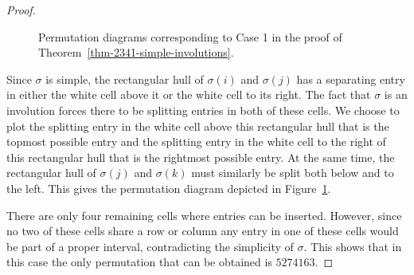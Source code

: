 \documentclass[10pt]{article}
\theoremstyle{plain}
\begin{document}
\begin{proof}
\begin{figure}
\begin{footnotesize}
\begin{subfigure}[b]{0.3\textwidth}
\begin{center}


			\end{center}	
			\caption{}
			\label{figure:6_1-3}
		\end{subfigure}
		\hfill\hfill
		\caption{Permutation diagrams corresponding to Case 1 in the proof of Theorem~\ref{thm-2341-simple-involutions}.}
		\label{figure:6_1-group-1}
	\end{footnotesize}
	\end{figure}
	
	Since $\sigma$ is simple, the rectangular hull of $\sigma(i)$ and $\sigma(j)$ has a separating entry in either the white cell above it or the white cell to its right. The fact that $\sigma$ is an involution forces there to be splitting entries in both of these cells. We choose to plot the splitting entry in the white cell above this rectangular hull that is the topmost possible entry and the splitting entry in the white cell to the right of this rectangular hull that is the rightmost possible entry. At the same time, the rectangular hull of $\sigma(j)$ and $\sigma(k)$ must similarly be split both below and to the left. This gives the permutation diagram depicted in Figure~\ref{figure:6_1-3}.
	
	There are only four remaining cells where entries can be inserted. However, since no two of these cells share a row or column any entry in one of these cells would be part of a proper interval, contradicting the simplicity of $\sigma$. This shows that in this case the only permutation that can be obtained is $5274163$.
	

\end{proof}
\end{document}
